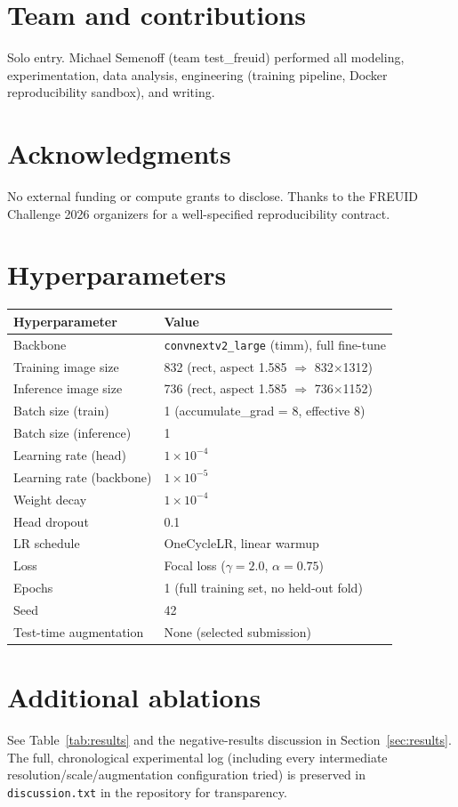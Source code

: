 \documentclass[11pt,a4paper]{article}
\newcommand{\teamname}{test\_freuid}
\begin{document}
\section{Team and contributions}
Solo entry. Michael Semenoff (team \teamname) performed all modeling,
experimentation, data analysis, engineering (training pipeline, Docker
reproducibility sandbox), and writing.

\section*{Acknowledgments}
No external funding or compute grants to disclose. Thanks to the FREUID
Challenge 2026 organizers for a well-specified reproducibility contract.




\appendix
\section{Hyperparameters}
\label{app:hparams}
\begin{table}[h]
  \centering
  \small
  \begin{tabular}{ll}
    \toprule
    Hyperparameter & Value \\
    \midrule
    Backbone & \texttt{convnextv2\_large} (timm), full fine-tune \\
    Training image size & 832 (rect, aspect 1.585 $\Rightarrow$ 832$\times$1312) \\
    Inference image size & 736 (rect, aspect 1.585 $\Rightarrow$ 736$\times$1152) \\
    Batch size (train) & 1 (accumulate\_grad = 8, effective 8) \\
    Batch size (inference) & 1 \\
    Learning rate (head) & $1\times10^{-4}$ \\
    Learning rate (backbone) & $1\times10^{-5}$ \\
    Weight decay & $1\times10^{-4}$ \\
    Head dropout & 0.1 \\
    LR schedule & OneCycleLR, linear warmup \\
    Loss & Focal loss ($\gamma=2.0$, $\alpha=0.75$) \\
    Epochs & 1 (full training set, no held-out fold) \\
    Seed & 42 \\
    Test-time augmentation & None (selected submission) \\
    \bottomrule
  \end{tabular}
\end{table}

\section{Additional ablations}
See Table~\ref{tab:results} and the negative-results discussion in
Section~\ref{sec:results}. The full, chronological experimental log
(including every intermediate resolution/scale/augmentation configuration
tried) is preserved in \texttt{discussion.txt} in the repository for
transparency.
\end{document}
